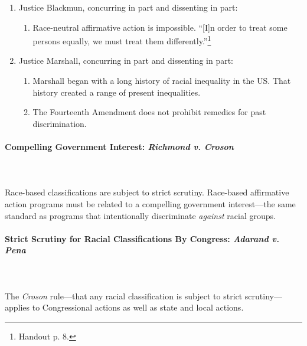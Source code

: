 \begin{enumerate}
    \item Justice Blackmun, concurring in part and dissenting in part:
    \begin{enumerate}
        \item Race-neutral affirmative action is impossible. ``[I]n order to 
        treat some persons equally, we must treat them 
        differently.''\footnote{Handout p. 8.}
    \end{enumerate}
    \item Justice Marshall, concurring in part and dissenting in part:
    \begin{enumerate}
        \item Marshall began with a long history of racial inequality in the 
        US. That history created a range of present inequalities.
        \item The Fourteenth Amendment does not prohibit remedies for past 
        discrimination.
    \end{enumerate}
\end{enumerate}

\paragraph{Compelling Government Interest: \emph{Richmond v. Croson}}
~\\\\
Race-based classifications are subject to strict scrutiny. Race-based 
affirmative action programs must be related to a compelling government 
interest---the same standard as programs that intentionally discriminate 
\emph{against} racial groups.


\paragraph{Strict Scrutiny for Racial Classifications By Congress: 
\emph{Adarand v. Pena}}
~\\\\
The \emph{Croson} rule---that any racial classification is subject to strict 
scrutiny---applies to Congressional actions as well as state and local 
actions.

 
